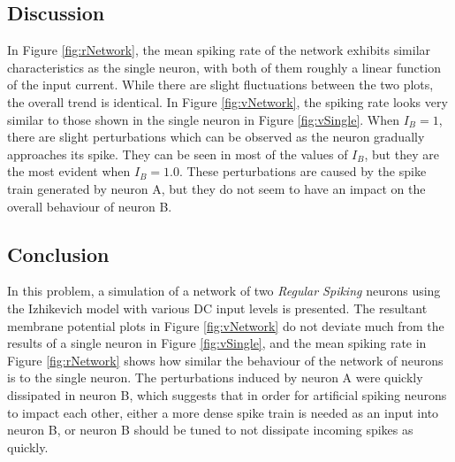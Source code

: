 \documentclass[a4paper, 11pt, titlepage]{article}
\newcommand{\figRef}[1]{Figure \ref{#1}}
\begin{document}
  \subsection{Discussion}
  In \figRef{fig:rNetwork}, the mean spiking rate of the network exhibits
  similar characteristics as the single neuron, with both of them roughly
  a linear function of the input current.
  While there are slight fluctuations between the two plots, the overall trend
  is identical.
  In \figRef{fig:vNetwork}, the spiking rate looks very similar to those shown
  in the single neuron in \figRef{fig:vSingle}.
  When $I_{B} = 1$, there are slight perturbations which can be observed as the
  neuron gradually approaches its spike.
  They can be seen in most of the values of $I_{B}$, but they are the most
  evident when $I_{B} = 1.0$.
  These perturbations are caused by the spike train generated by neuron A, but
  they do not seem to have an impact on the overall behaviour of neuron B.
  \subsection{Conclusion}
  In this problem, a simulation of a network of two \textit{Regular Spiking}
  neurons using the Izhikevich model \cite{Izhikevich2003} with various DC
  input levels is presented.
  The resultant membrane potential plots in \figRef{fig:vNetwork} do not
  deviate much from the results of a single neuron in \figRef{fig:vSingle},
  and the mean spiking rate in \figRef{fig:rNetwork} shows how similar the
  behaviour of the network of neurons is to the single neuron.
  The perturbations induced by neuron A were quickly dissipated in neuron B,
  which suggests that in order for artificial spiking neurons to impact each
  other, either a more dense spike train is needed as an input into neuron B,
  or neuron B should be tuned to not dissipate incoming spikes as quickly.
  \pagebreak
  \printbibliography
\end{document}
